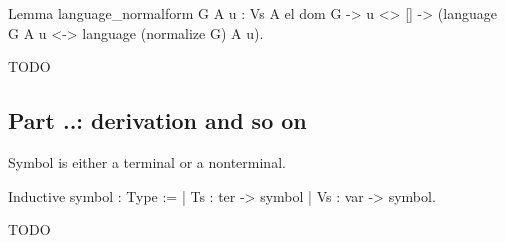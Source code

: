 
\begin{listing}[h]
	\begin{pyglist}[language=coq, numbers=none, numbersep=5pt]
  Lemma language_normalform G A u :
    Vs A el dom G -> 
    u <> [] -> 
    (language G A u <-> 
       language (normalize G) A u).
	\end{pyglist}
	\caption{TODO}
	\label{lst:verbments1}
\end{listing}



\subsection{Part ..: derivation and so on}

Symbol is either a terminal or a nonterminal.

\begin{listing}[h]
	\begin{pyglist}[language=coq, numbers=none, numbersep=5pt]
		Inductive symbol : Type :=
		| Ts : ter -> symbol
		| Vs : var -> symbol.
	\end{pyglist}
	\caption{TODO}
	\label{lst:verbments1}
\end{listing}

